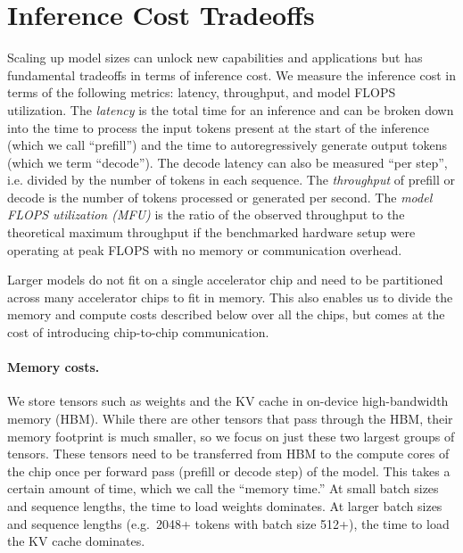 \section{Inference Cost Tradeoffs}\label{sec:analyticalmodel}
Scaling up model sizes can unlock new capabilities and applications but has fundamental tradeoffs in terms of inference cost. We measure the inference cost in terms of the following metrics: latency, throughput, and model FLOPS utilization. The \emph{latency} is the total time for an inference and can be broken down into the time to process the input tokens present at the start of the inference (which we call ``prefill'') and the time to autoregressively generate output tokens (which we term ``decode''). The decode latency can also be measured ``per step'', i.e. divided by the number of tokens in each sequence. The \emph{throughput} of prefill or decode is the number of tokens processed or generated per second. The \emph{model FLOPS utilization (MFU)} is the ratio of the observed throughput to the theoretical maximum throughput if the benchmarked hardware setup were operating at peak FLOPS with no memory or communication overhead.

Larger models do not fit on a single accelerator chip and need to be partitioned across many accelerator chips to fit in memory. This also enables us to divide the memory and compute costs described below over all the chips, but comes at the cost of introducing chip-to-chip communication.

\paragraph{Memory costs.} We store tensors such as weights and the KV cache in on-device high-bandwidth memory (HBM). While there are other tensors that pass through the HBM, their memory footprint is much smaller, so we focus on just these two largest groups of tensors. These tensors need to be transferred from HBM to the compute cores of the chip once per forward pass (prefill or decode step) of the model. This takes a certain amount of time, which we call the ``memory time.'' At small batch sizes and sequence lengths, the time to load weights dominates. At larger batch sizes and sequence lengths (e.g.\ 2048+ tokens with batch size 512+), the time to load the KV cache dominates.

